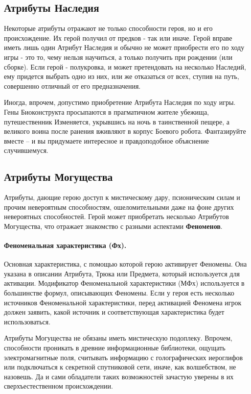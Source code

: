 \subsection{Атрибуты Наследия}
Некоторые атрибуты отражают не только способности героя, но и его происхождение. Их герой получил от предков - так или иначе. Герой вправе иметь лишь один Атрибут Наследия и обычно не может приобрести его по ходу игры - это то, чему нельзя научиться, а только получить при рождении (или сборке). Если герой - полукровка, и может претендовать на несколько Наследий, ему придется выбрать одно из них, или же отказаться от всех, ступив на путь, совершенно отличный от его предназначения.
\begin{tcolorbox}
	Иногда, впрочем, допустимо приобретение Атрибута Наследия по ходу игры. Гены Биоконструкта просыпаются в прагматичном жителе убежища, путешественник Изменяется, укрывшись на ночь в таинственной пещере, а великого воина после ранения вживляют в корпус Боевого робота. Фантазируйте вместе – и вы придумаете интересное и правдоподобное объяснение случившемуся.
\end{tcolorbox}

\subsection{Атрибуты Могущества}
Атрибуты, дающие герою доступ к мистическому дару, псионическим силам и прочим невероятным способностям, ошеломительными даже на фоне других невероятных способностей. Герой может приобретать несколько Атрибутов Могущества, что отражает знакомство с разными аспектами \textbf{Феноменов}.
\paragraph{Феноменальная характеристика (Фх).} Основная характеристика, с помощью которой герою активирует Феномены. Она указана в описании Атрибута, Трюка или Предмета, который используется для активации. Модификатор Феноменальной характеристики (МФх) используется в большинстве формул, описывающих Феномены. 
\newline Если у героя есть несколько источников Феноменальной характеристики, перед активацией Феномена игрок должен заявить, какой источник и соответствующая характеристика будет использоваться.
\begin{tcolorbox}
    Атрибуты Могущества не обязаны иметь мистическую подоплеку. Впрочем, способности проникать в древние информационные библиотеки, ощущать электромагнитные поля, считывать информацию с голографических иероглифов или подключаться к секретной спутниковой сети, иначе, как волшебством, не назовешь. Да и сами обладатели таких возможностей зачастую уверены в их сверхъестественном происхождении.
\end{tcolorbox}

